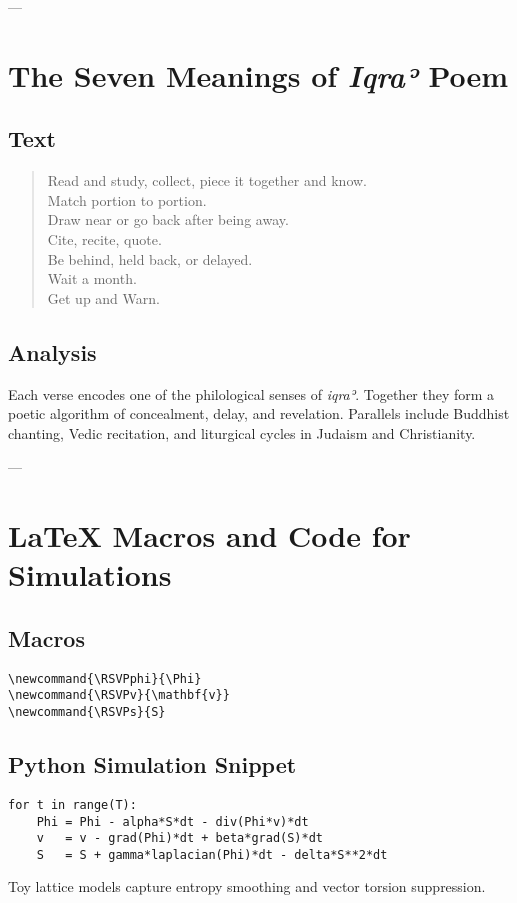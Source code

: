 ---

\chapter{The Seven Meanings of \emph{Iqraʾ} Poem}
\section*{Text}
\begin{quote}
Read and study, collect, piece it together and know.\\
Match portion to portion.\\
Draw near or go back after being away.\\
Cite, recite, quote.\\
Be behind, held back, or delayed.\\
Wait a month.\\
Get up and Warn.
\end{quote}

\section*{Analysis}
Each verse encodes one of the philological senses of \emph{iqraʾ}.  
Together they form a poetic algorithm of concealment, delay, and revelation.  
Parallels include Buddhist chanting, Vedic recitation, and liturgical cycles in Judaism and Christianity.  

---

\chapter{LaTeX Macros and Code for Simulations}
\section*{Macros}
\begin{verbatim}
\newcommand{\RSVPphi}{\Phi}
\newcommand{\RSVPv}{\mathbf{v}}
\newcommand{\RSVPs}{S}
\end{verbatim}

\section*{Python Simulation Snippet}
\begin{verbatim}
for t in range(T):
    Phi = Phi - alpha*S*dt - div(Phi*v)*dt
    v   = v - grad(Phi)*dt + beta*grad(S)*dt
    S   = S + gamma*laplacian(Phi)*dt - delta*S**2*dt
\end{verbatim}
Toy lattice models capture entropy smoothing and vector torsion suppression.  

